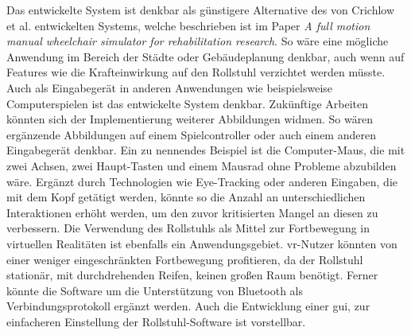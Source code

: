 Das entwickelte System ist denkbar als günstigere Alternative des von Crichlow et al. entwickelten Systems, welche beschrieben ist im Paper \textit{A full motion manual
    wheelchair simulator for rehabilitation research}\cite{crichlowFullMotionManual2011}.
So wäre eine mögliche Anwendung im Bereich der Städte oder Gebäudeplanung denkbar, auch wenn auf Features wie die Krafteinwirkung auf den Rollstuhl verzichtet werden müsste.
Auch als Eingabegerät in anderen Anwendungen wie beispielsweise Computerspielen ist das entwickelte System denkbar.
Zukünftige Arbeiten könnten sich der Implementierung weiterer Abbildungen widmen.
So wären ergänzende Abbildungen auf einem Spielcontroller oder auch einem anderen Eingabegerät denkbar.
Ein zu nennendes Beispiel ist die Computer-Maus, die mit zwei Achsen, zwei Haupt-Tasten und einem Mausrad ohne Probleme abzubilden wäre.
Ergänzt durch Technologien wie Eye-Tracking oder anderen Eingaben, die mit dem Kopf getätigt werden, könnte so die Anzahl an unterschiedlichen Interaktionen erhöht werden, um den zuvor kritisierten Mangel an diesen zu verbessern.
Die Verwendung des Rollstuhls als Mittel zur Fortbewegung in virtuellen Realitäten ist ebenfalls ein Anwendungsgebiet.
\ac{vr}-Nutzer könnten von einer weniger eingeschränkten Fortbewegung profitieren, da der Rollstuhl stationär, mit durchdrehenden Reifen, keinen großen Raum benötigt.
Ferner könnte die Software um die Unterstützung von Bluetooth als Verbindungsprotokoll ergänzt werden.
Auch die Entwicklung einer \ac{gui}, zur einfacheren Einstellung der Rollstuhl-Software ist vorstellbar.